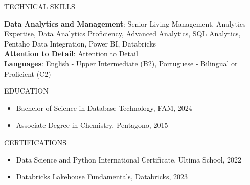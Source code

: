 \documentclass{resume} %
\begin{document}
\begin{rSection}{TECHNICAL SKILLS}
    \begin{flushleft}
                    \textbf{Data Analytics and Management}: Senior Living Management, Analytics Expertise, Data Analytics Proficiency, Advanced Analytics, SQL Analytics, Pentaho Data Integration, Power BI, Databricks \\
                    \textbf{Attention to Detail}: Attention to Detail \\
                    \textbf{Languages}: English {-} Upper Intermediate (B2), Portuguese {-} Bilingual or Proficient (C2) \\
            \end{flushleft}
\end{rSection}

\begin{rSection}{EDUCATION}
    \begin{flushleft}
    \begin{itemize}
                    \item Bachelor of Science in Database Technology, FAM, 2024 \\
                    \item Associate Degree in Chemistry, Pentagono, 2015 \\
            \end{itemize}
    \end{flushleft}
\end{rSection}

\begin{rSection}{CERTIFICATIONS}
    \begin{flushleft}
            \begin{itemize}
                    \item Data Science and Python International Certificate, Ultima School, 2022 \\
                    \item Databricks Lakehouse Fundamentals, Databricks, 2023 \\
                            \end{itemize}
        \end{flushleft}
\end{rSection}
\end{document}
